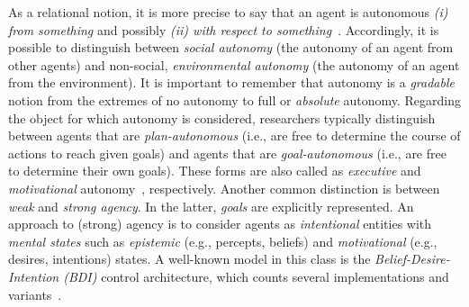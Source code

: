 As a relational notion,
 it is more precise to say that 
 an agent is autonomous \emph{(i) from something}
 and possibly \emph{(ii) with respect to something}~\cite{Castelfranchi2003founding-autonomy}.
%
Accordingly, it is possible to distinguish
 between
 \emph{social autonomy} (the autonomy of an agent from other agents)
 and 
 non-social, \emph{environmental autonomy} (the autonomy of an agent from the environment).
%
It is important to remember that autonomy is a \emph{gradable} notion from the extremes of no autonomy to full or \emph{absolute} autonomy.
%
Regarding the object for which autonomy is considered,
 researchers typically distinguish between
 agents that are
 \emph{plan-autonomous} (i.e., are free to determine the course of actions to reach given goals)
 and agents that are \emph{goal-autonomous} (i.e., are free to determine their own goals).
%
These forms are also called as \emph{executive} and \emph{motivational} autonomy~\cite{castelfranchi1994guarantees-for-autonomy-cognitive-agent-arch}, respectively.
%
Another common distinction is 
 between \emph{weak} and \emph{strong agency}.
%
In the latter, \emph{goals} are explicitly represented.
%
An approach to (strong) agency is to consider agents 
 as \emph{intentional} entities with \emph{mental states}
 such as \emph{epistemic} (e.g., percepts, beliefs)
 and \emph{motivational} (e.g., desires, intentions) states.
%
A well-known model in this class is the \emph{Belief-Desire-Intention (BDI)} control architecture, which counts several implementations and variants~\cite{desilva2020bdi}.

